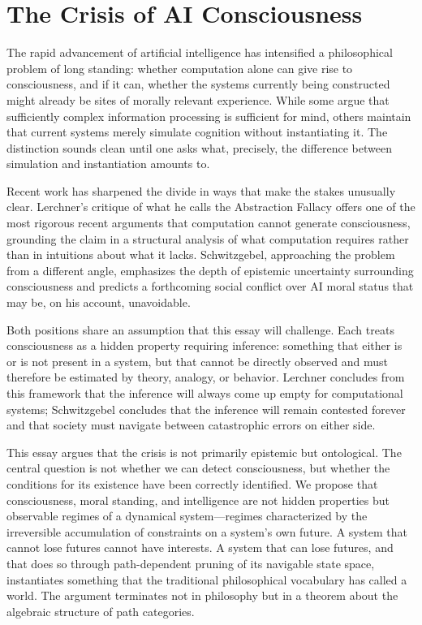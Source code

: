 \documentclass[11pt]{article}
\theoremstyle{definition}
\theoremstyle{remark}
\begin{document}
\newpage

\section{The Crisis of AI Consciousness}

The rapid advancement of artificial intelligence has intensified a philosophical problem of
long standing: whether computation alone can give rise to consciousness, and if it can,
whether the systems currently being constructed might already be sites of morally relevant
experience. While some argue that sufficiently complex information processing is sufficient
for mind, others maintain that current systems merely simulate cognition without instantiating
it. The distinction sounds clean until one asks what, precisely, the difference between
simulation and instantiation amounts to.

Recent work has sharpened the divide in ways that make the stakes unusually clear. Lerchner's
critique of what he calls the Abstraction Fallacy offers one of the most rigorous recent
arguments that computation cannot generate consciousness, grounding the claim in a structural
analysis of what computation requires rather than in intuitions about what it lacks.
Schwitzgebel, approaching the problem from a different angle, emphasizes the depth of
epistemic uncertainty surrounding consciousness and predicts a forthcoming social conflict
over AI moral status that may be, on his account, unavoidable.

Both positions share an assumption that this essay will challenge. Each treats consciousness
as a hidden property requiring inference: something that either is or is not present in a
system, but that cannot be directly observed and must therefore be estimated by theory,
analogy, or behavior. Lerchner concludes from this framework that the inference will always
come up empty for computational systems; Schwitzgebel concludes that the inference will
remain contested forever and that society must navigate between catastrophic errors on either
side.

This essay argues that the crisis is not primarily epistemic but ontological. The central
question is not whether we can detect consciousness, but whether the conditions for its
existence have been correctly identified. We propose that consciousness, moral standing, and
intelligence are not hidden properties but observable regimes of a dynamical system---regimes
characterized by the irreversible accumulation of constraints on a system's own future. A
system that cannot lose futures cannot have interests. A system that can lose futures, and
that does so through path-dependent pruning of its navigable state space, instantiates
something that the traditional philosophical vocabulary has called a world. The argument
terminates not in philosophy but in a theorem about the algebraic structure of path categories.
\end{document}
